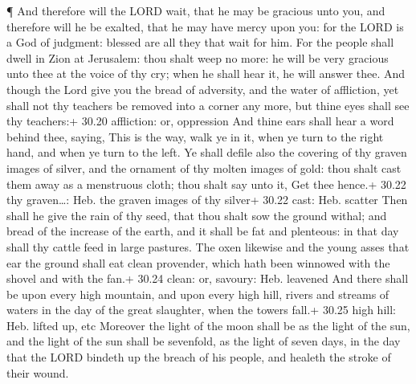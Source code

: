  ¶ And therefore will the LORD wait, that he may be
gracious unto you, and therefore will he be exalted, that he may have
mercy upon you: for the LORD is a God of judgment: blessed are all they
that wait for him.  For the people shall dwell in Zion at
Jerusalem: thou shalt weep no more: he will be very gracious unto thee
at the voice of thy cry; when he shall hear it, he will answer thee.
 And though the Lord give you the bread of adversity, and
the water of affliction, yet shall not thy teachers be removed into a
corner any more, but thine eyes shall see thy teachers:+ 30.20
affliction: or, oppression  And thine ears shall hear a
word behind thee, saying, This is the way, walk ye in it, when ye turn
to the right hand, and when ye turn to the left.  Ye shall
defile also the covering of thy graven images of silver, and the
ornament of thy molten images of gold: thou shalt cast them away as a
menstruous cloth; thou shalt say unto it, Get thee hence.+ 30.22 thy
graven\ldots: Heb. the graven images of thy silver+ 30.22 cast: Heb.
scatter  Then shall he give the rain of thy seed, that thou
shalt sow the ground withal; and bread of the increase of the earth, and
it shall be fat and plenteous: in that day shall thy cattle feed in
large pastures.  The oxen likewise and the young asses that
ear the ground shall eat clean provender, which hath been winnowed with
the shovel and with the fan.+ 30.24 clean: or, savoury: Heb. leavened
 And there shall be upon every high mountain, and upon
every high hill, rivers and streams of waters in the day of the great
slaughter, when the towers fall.+ 30.25 high hill: Heb. lifted up, etc
 Moreover the light of the moon shall be as the light of
the sun, and the light of the sun shall be sevenfold, as the light of
seven days, in the day that the LORD bindeth up the breach of his
people, and healeth the stroke of their wound.

